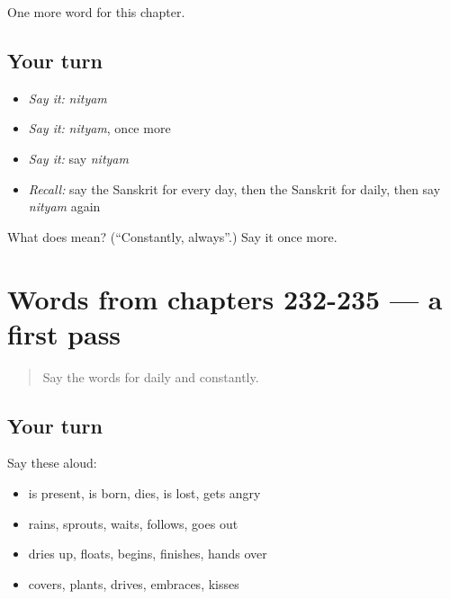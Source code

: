 \begin{grammarlens}[title={What you've built}]
One more word for this chapter.
\end{grammarlens}

\subsection*{Your turn}
\begin{itemize}
\raggedright
  \item \emph{Say it:} \emph{nityam}
  \item \emph{Say it:} \emph{nityam}, once more
  \item \emph{Say it:} say \emph{nityam}
  \item \emph{Recall:} say the Sanskrit for every day, then the Sanskrit for daily, then say \emph{nityam} again
\end{itemize}

\begin{tcolorbox}[breakable,colback=teal!4,colframe=teal!35!black,title={Before you move on}]
What does  mean? (\textquotedblleft{}Constantly, always\textquotedblright{}.) Say it once more.
\end{tcolorbox}
\section[(dialogue)]{Words from chapters 232-235 — a first pass}

\label{lesson:SA-R240-first-pass-words-from-chapters-232-235}



\begin{quote}
Say the words for daily and constantly.
\end{quote}

\subsection*{Your turn}
Say these aloud:

\begin{itemize}
\raggedright
  \item is present, is born, dies, is lost, gets angry
  \item rains, sprouts, waits, follows, goes out
  \item dries up, floats, begins, finishes, hands over
  \item covers, plants, drives, embraces, kisses
\end{itemize}

